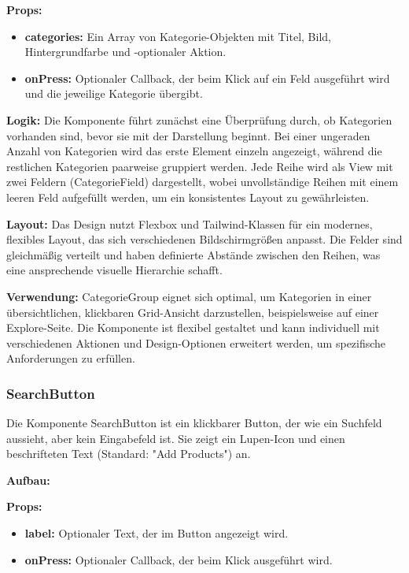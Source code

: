 \textbf{Props:}
\begin{itemize}
    \item \textbf{categories:} Ein Array von Kategorie-Objekten mit Titel, Bild, Hintergrundfarbe und -optionaler Aktion.
    \item \textbf{onPress:} Optionaler Callback, der beim Klick auf ein Feld ausgeführt wird und die jeweilige Kategorie übergibt.
\end{itemize}

\textbf{Logik:}
Die Komponente führt zunächst eine Überprüfung durch, ob Kategorien vorhanden sind, bevor sie mit der Darstellung beginnt. Bei einer ungeraden Anzahl von Kategorien wird das erste Element einzeln angezeigt, während die restlichen Kategorien paarweise gruppiert werden. Jede Reihe wird als View mit zwei Feldern (CategorieField) dargestellt, wobei unvollständige Reihen mit einem leeren Feld aufgefüllt werden, um ein konsistentes Layout zu gewährleisten.

\textbf{Layout:}
Das Design nutzt Flexbox und Tailwind-Klassen für ein modernes, flexibles Layout, das sich verschiedenen Bildschirmgrößen anpasst. Die Felder sind gleichmäßig verteilt und haben definierte Abstände zwischen den Reihen, was eine ansprechende visuelle Hierarchie schafft.

\noindent\textbf{Verwendung:} CategorieGroup eignet sich optimal, um Kategorien in einer übersichtlichen, klickbaren Grid-Ansicht darzustellen, beispielsweise auf einer Explore-Seite. Die Komponente ist flexibel gestaltet und kann individuell mit verschiedenen Aktionen und Design-Optionen erweitert werden, um spezifische Anforderungen zu erfüllen.

\subsubsection{SearchButton}
Die Komponente SearchButton ist ein klickbarer Button, der wie ein Suchfeld aussieht, aber kein Eingabefeld ist. Sie zeigt ein Lupen-Icon und einen beschrifteten Text (Standard: "Add Products") an.

\noindent\textbf{Aufbau:}

\textbf{Props:}
\begin{itemize}
    \item \textbf{label:} Optionaler Text, der im Button angezeigt wird.
    \item \textbf{onPress:} Optionaler Callback, der beim Klick ausgeführt wird.
\end{itemize}

